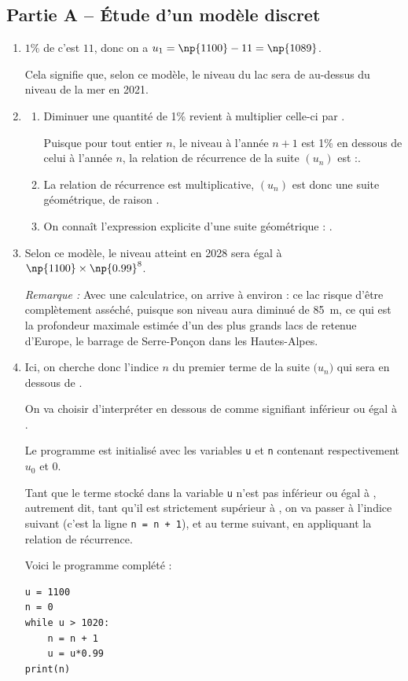 \subsection*{Partie A -- Étude d'un modèle discret}

	\begin{enumerate}
		\item $1\%$ de  c'est $11$, donc on a {$u_1=\np{1100}-11=\np{1089}$.}

		Cela signifie que, selon ce modèle, le niveau du lac sera de  au-dessus du niveau de la mer en 2021.

		\item
		\begin{enumerate}
			\item Diminuer une quantité de 1\% revient à multiplier celle-ci par .

			Puisque pour tout entier $n$, le niveau à l'année $n+1$ est 1\% en dessous de celui à l'année $n$, la relation de récurrence de la suite {$(u_n)$} est :.

			\item La relation de récurrence est multiplicative, {$(u_n)$} est donc une suite géométrique, de raison .

			\item On connaît l'expression explicite d'une suite géométrique :
			.
		\end{enumerate}

		\item Selon ce modèle, le niveau atteint en 2028 sera égal à {$\np{1100}\times\np{0.99}^8$}.

		\emph{Remarque :} Avec une calculatrice, on arrive à environ  : ce lac risque d'être complètement asséché, puisque son niveau aura diminué de 85~m, ce qui est la profondeur maximale estimée d'un des plus grands lacs de retenue d'Europe, le barrage de Serre-Ponçon dans les Hautes-Alpes.

		\item Ici, on cherche donc l'indice $n$ du premier terme de la suite $\big(u_n\big)$ qui sera \og en dessous de \fg{}.

		On va choisir d'interpréter \og en dessous de \fg{} comme signifiant \og inférieur ou égal à  \fg{}.

		Le programme est initialisé avec les variables \texttt{u} et \texttt{n} contenant respectivement $u_0$ et $0$.

		Tant que le terme stocké dans la variable \texttt{u} n'est pas inférieur ou égal à , autrement dit, tant qu'il est strictement supérieur à , on va passer à l'indice suivant (c'est la ligne \texttt{n = n + 1}), et au terme suivant, en appliquant la relation de récurrence.

		Voici le programme complété :
\begin{lstlisting}[style=python,xleftmargin=4.5cm,xrightmargin=4.5cm,numbers=none]
u = 1100
n = 0
while u > 1020:
	n = n + 1
	u = u*0.99
print(n)
\end{lstlisting}
	\end{enumerate}

